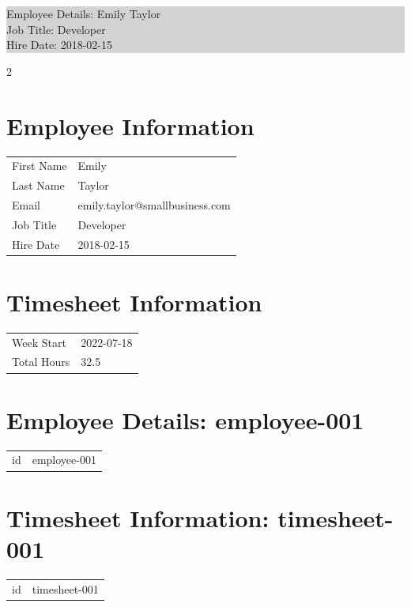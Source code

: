\documentclass{article}
\begin{document}
\begin{center}
\colorbox{lightgray}{%
  \parbox{\textwidth}{%
    \raggedright
    Employee Details: Emily Taylor\\
    Job Title: Developer\\
    Hire Date: 2018-02-15
  }%
}
\end{center}

\setlength{\multicolsep}{0pt}
\begin{multicols}{2}
\raggedcolumns

\section*{Employee Information}

\begin{tabularx}{\columnwidth}{lX}
First Name & Emily \\
Last Name & Taylor \\
Email & emily.taylor@smallbusiness.com \\
Job Title & Developer \\
Hire Date & 2018-02-15
\end{tabularx}

\vspace{\parskip}

\section*{Timesheet Information}

\begin{tabularx}{\columnwidth}{lX}
Week Start & 2022-07-18 \\
Total Hours & 32.5
\end{tabularx}

\section*{Employee Details: employee-001}

\begin{tabularx}{\columnwidth}{lX}
id & employee-001
\end{tabularx}

\vspace{\parskip}

\section*{Timesheet Information: timesheet-001}

\begin{tabularx}{\columnwidth}{lX}
id & timesheet-001
\end{tabularx}

\end{multicols}
\end{document}
